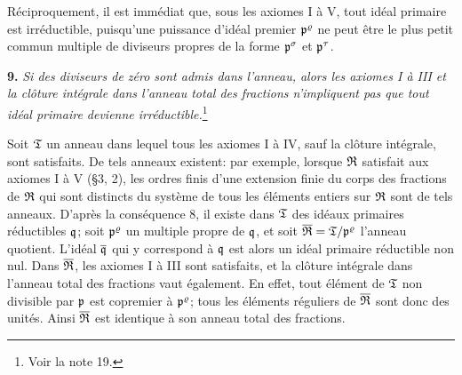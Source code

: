 Réciproquement, il est immédiat que, sous les axiomes I à V, tout idéal primaire est irréductible, puisqu'une puissance d'idéal premier $\mathfrak{p}^\varrho$ ne peut être le plus petit commun multiple de diviseurs propres de la forme $\mathfrak{p}^\sigma$ et $\mathfrak{p}^\tau$.

\textbf{9.} \emph{Si des diviseurs de zéro sont admis dans l'anneau, alors les axiomes I à III et la clôture intégrale dans l'anneau total des fractions n'impliquent pas que tout idéal primaire devienne irréductible.}\footnote{Voir la note 19.}

Soit $\mathfrak{T}$ un anneau dans lequel tous les axiomes I à IV, sauf la clôture intégrale, sont satisfaits. De tels anneaux existent: par exemple, lorsque $\mathfrak{R}$ satisfait aux axiomes I à V (\S{}3, 2), les ordres finis d'une extension finie du corps des fractions de $\mathfrak{R}$ qui sont distincts du système de tous les éléments entiers sur $\mathfrak{R}$ sont de tels anneaux. D'après la conséquence 8, il existe dans $\mathfrak{T}$ des idéaux primaires réductibles $\mathfrak{q}$; soit $\mathfrak{p}^\varrho$ un multiple propre de $\mathfrak{q}$, et soit $\overline{\mathfrak{R}}=\mathfrak{T}/\mathfrak{p}^\varrho$ l'anneau quotient. L'idéal $\overline{\mathfrak{q}}$ qui y correspond à $\mathfrak{q}$ est alors un idéal primaire réductible non nul. Dans $\overline{\mathfrak{R}}$, les axiomes I à III sont satisfaits, et la clôture intégrale dans l'anneau total des fractions vaut également. En effet, tout élément de $\mathfrak{T}$ non divisible par $\mathfrak{p}$ est copremier à $\mathfrak{p}^\varrho$; tous les éléments réguliers de $\overline{\mathfrak{R}}$ sont donc des unités. Ainsi $\overline{\mathfrak{R}}$ est identique à son anneau total des fractions.
